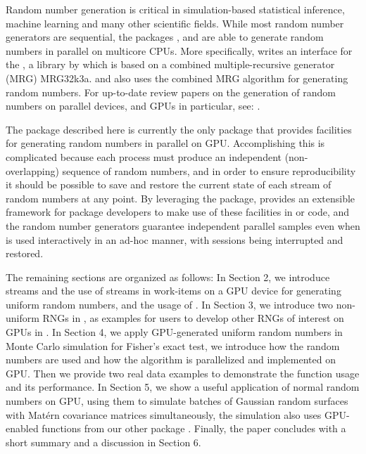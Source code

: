 \documentclass[article,nojss]{jss}\usepackage[]{graphicx}\usepackage[]{color}
\newcommand{\fct}[1]{\code{#1()}}
\begin{document}
Random number generation is critical in simulation-based statistical inference, machine learning and many other scientific fields. While most random number generators are sequential, the  packages ,  \citep*{future1.19.1} and  \citep{sevcikova2015package} are able to generate random numbers in parallel on multicore CPUs. More specifically,  writes an interface for the , a  library by \cite{l2002object} which is based on a combined multiple-recursive generator (MRG) MRG32k3a.  and  also uses the combined MRG algorithm for generating random numbers. For up-to-date review papers on the generation of random numbers on parallel devices, and GPUs in particular, see:  \cite{rLEC15a,rLEC17p,rLEC21a}.


The  package described here is currently the only  package that provides facilities for generating random numbers in parallel on GPU. Accomplishing this is complicated because each process must produce an independent (non-overlapping) sequence of random numbers, and in order to ensure reproducibility it should be possible to save and restore the current state of each stream of random numbers at any point.  By leveraging the  package,  provides an extensible framework for  package developers to make use of these facilities in  or  code, and the random number generators guarantee independent parallel samples even when  is used interactively in an ad-hoc manner, with sessions being interrupted and restored.


The remaining sections are organized as follows:
In Section 2, we introduce streams and the use of streams in work-items on a GPU device for generating uniform random numbers, and the usage of \fct{runifGpu}.
In Section 3, we introduce two non-uniform RNGs in , as examples for users to develop other RNGs of interest on GPUs in .
In Section 4, we apply GPU-generated uniform random numbers in Monte Carlo simulation for Fisher’s exact test, we introduce how the random numbers are used and how the algorithm is parallelized and implemented on GPU. Then we provide two real data examples to demonstrate the function usage and its  performance.
In Section 5, we show a useful application of normal random numbers on GPU, using them to simulate batches of Gaussian random surfaces with Mat\'ern covariance matrices simultaneously, the simulation also uses GPU-enabled functions from our other package .
Finally, the paper concludes with a short summary and a discussion in Section 6.
\end{document}
